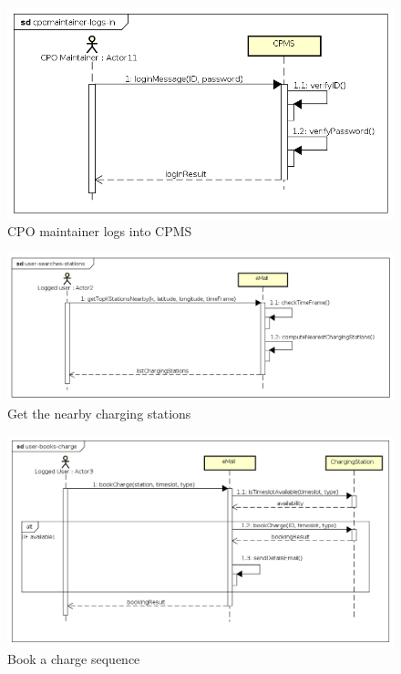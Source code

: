 \begin{figure}[!h]
    \begin{center}
        \includegraphics[keepaspectratio, width=16cm]{Sequence/cpomaintainer-logs-in.png}
        \caption{\ac{CPO} maintainer logs into \ac{CPMS}}
    \end{center}
\end{figure}
\begin{figure}[!h]
    \begin{center}
        \includegraphics[keepaspectratio, width=16cm]{Sequence/user-searches-stations.png}
        \caption{Get the nearby charging stations}
    \end{center}
\end{figure}
\begin{figure}[!h]
    \begin{center}
        \includegraphics[keepaspectratio, width=16cm]{Sequence/user-books-charge.png}
        \caption{Book a charge sequence}
    \end{center}
\end{figure}
